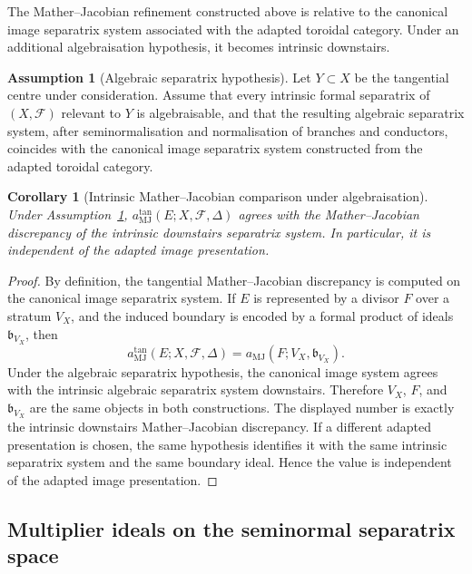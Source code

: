 \documentclass[11pt]{amsart}
\numberwithin{equation}{section}
\theoremstyle{plain}
\newtheorem{Corollary}[Theorem]{Corollary}
\theoremstyle{definition}
\newtheorem{Assumption}[Theorem]{Assumption}
\newcommand{\MJ}{\mathrm{MJ}}
\newcommand{\bbound}{\mathfrak b}
\newcommand{\cF}{\mathcal F}
\begin{document}
The Mather--Jacobian refinement constructed above is relative to the
canonical image separatrix system associated with the adapted toroidal
category.  Under an additional algebraisation hypothesis, it becomes
intrinsic downstairs.

\begin{Assumption}[Algebraic separatrix hypothesis]
\label{ass:algebraic-separatrix}
Let $Y\subset X$ be the tangential centre under consideration.  Assume that
every intrinsic formal separatrix of $(X,\cF)$ relevant to $Y$ is
algebraisable, and that the resulting algebraic separatrix system, after
seminormalisation and normalisation of branches and conductors, coincides
with the canonical image separatrix system constructed from the adapted
toroidal category.
\end{Assumption}

\begin{Corollary}[Intrinsic Mather--Jacobian comparison under algebraisation]
\label{cor:intrinsic-mj-algebraisation}
Under Assumption~\ref{ass:algebraic-separatrix},
$a_{\MJ}^{\tan}(E;X,\cF,\Delta)$ agrees with the Mather--Jacobian
discrepancy of the intrinsic downstairs separatrix system.  In particular,
it is independent of the adapted image presentation.
\end{Corollary}

\begin{proof}
By definition, the tangential Mather--Jacobian discrepancy is computed on
the canonical image separatrix system.  If $E$ is represented by a divisor
$F$ over a stratum $V_X$, and the induced boundary is encoded by a formal
product of ideals $\bbound_{V_X}$, then
\[
a_{\MJ}^{\tan}(E;X,\cF,\Delta)
=
a_{\MJ}(F;V_X,\bbound_{V_X}).
\]
Under the algebraic separatrix hypothesis, the canonical image system agrees
with the intrinsic algebraic separatrix system downstairs.  Therefore
$V_X$, $F$, and $\bbound_{V_X}$ are the same objects in both constructions.
The displayed number is exactly the intrinsic downstairs Mather--Jacobian
discrepancy.  If a different adapted presentation is chosen, the same
hypothesis identifies it with the same intrinsic separatrix system and the
same boundary ideal.  Hence the value is independent of the adapted image
presentation.
\end{proof}

\subsection{Multiplier ideals on the seminormal separatrix space}
\end{document}

